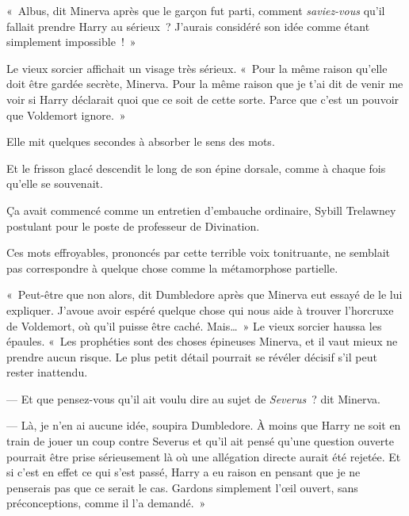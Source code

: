 \later

«~Albus, dit Minerva après que le garçon fut parti, comment \emph{saviez-vous} qu'il fallait prendre Harry au sérieux~?
J'aurais considéré son idée comme étant simplement impossible~!~»

Le vieux sorcier affichait un visage très sérieux.
«~Pour la même raison qu'elle doit être gardée secrète, Minerva.
Pour la même raison que je t'ai dit de venir me voir si Harry déclarait quoi que ce soit de cette sorte.
Parce que c'est un pouvoir que Voldemort ignore.~»

Elle mit quelques secondes à absorber le sens des mots.

Et le frisson glacé descendit le long de son épine dorsale, comme à chaque fois qu'elle se souvenait.

Ça avait commencé comme un entretien d'embauche ordinaire, Sybill Trelawney postulant pour le poste de professeur de Divination.


Ces mots effroyables, prononcés par cette terrible voix tonitruante, ne semblait pas correspondre à quelque chose comme la métamorphose partielle.

«~Peut-être que non alors, dit Dumbledore après que Minerva eut essayé de le lui expliquer.
J'avoue avoir espéré quelque chose qui nous aide à trouver l'horcruxe de Voldemort, où qu'il puisse être caché.
Mais…~» Le vieux sorcier haussa les épaules.
«~Les prophéties sont des choses épineuses Minerva, et il vaut mieux ne prendre aucun risque.
Le plus petit détail pourrait se révéler décisif s'il peut rester inattendu.

--- Et que pensez-vous qu'il ait voulu dire au sujet de \emph{Severus}~? dit Minerva.

--- Là, je n'en ai aucune idée, soupira Dumbledore.
À moins que Harry ne soit en train de jouer un coup contre Severus et qu'il ait pensé qu'une question ouverte pourrait être prise sérieusement là où une allégation directe aurait été rejetée.
Et si c'est en effet ce qui s'est passé, Harry a eu raison en pensant que je ne penserais pas que ce serait le cas.
Gardons simplement l'œil ouvert, sans préconceptions, comme il l'a demandé.~»

